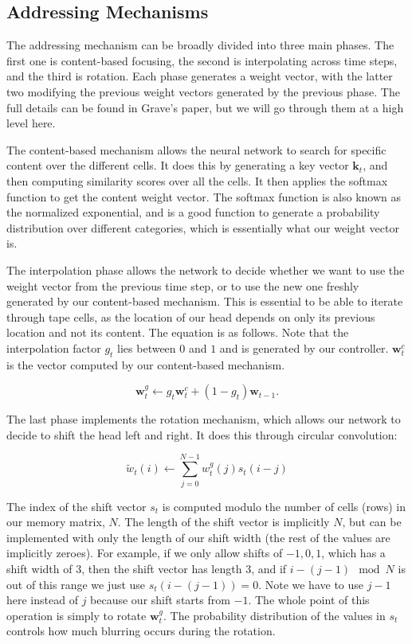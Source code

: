 \documentclass[12pt]{article}
\begin{document}
\subsection{Addressing Mechanisms}

The addressing mechanism can be broadly divided into three main phases.
The first one is content-based focusing, the second is interpolating across
time steps, and the third is rotation. Each phase generates
a weight vector, with the latter two modifying the previous weight vectors generated
by the previous phase. The full details can be found in Grave's paper, but we
will go through them at a high level here.

The content-based mechanism allows the neural network to search for specific
content over the different cells. It does this by generating a key vector
$\mathbf{k}_t$, and then computing similarity scores over all the cells. It
then applies the softmax function to get the content weight vector. The
softmax function is also known as the normalized exponential, and is a 
good function to generate a probability distribution over different categories,
which is essentially what our weight vector is.

The interpolation phase allows the network to decide whether we want to use the weight
vector from the previous time step, or to use the new one freshly generated by our
content-based mechanism. This is essential to be able to iterate through tape cells,
as the location of our head depends on only its previous location and not its
content. The equation is as follows. Note that the interpolation factor $g_t$
lies between $0$ and $1$ and is generated by our controller. $\mathbf{w}^c_t$ is
the vector computed by our content-based mechanism.

$$
\mathbf{w}^g_t \leftarrow g_t\mathbf{w}^c_t + (1-g_t)\mathbf{w}_{t-1}.
$$

The last phase implements the rotation mechanism, which allows our network to
decide to shift the head left and right. It does this through circular convolution:

$$
\widetilde{w}_t(i) \leftarrow \sum_{j=0}^{N-1}w^g_t(j) s_t(i-j)
$$

The index of the shift vector $s_t$ is computed modulo the number of cells (rows)
in our memory matrix, $N$. The length of the shift vector is implicitly $N$, but
can be implemented with only the length of our shift width (the rest of the
values are implicitly zeroes). For example, if we
only allow shifts of $-1, 0, 1$, which has a shift width of $3$,
then the shift vector has length 3, and if
$i - (j - 1) \mod N$ is out of this range we just use $s_t(i-(j-1)) = 0$. Note
we have to use $j-1$ here instead of $j$ because our shift starts from $-1$. The
whole point of this operation is simply to rotate $\mathbf{w}^g_t$. The probability
distribution of the values in $s_t$ controls how much blurring occurs during the
rotation.
\end{document}
